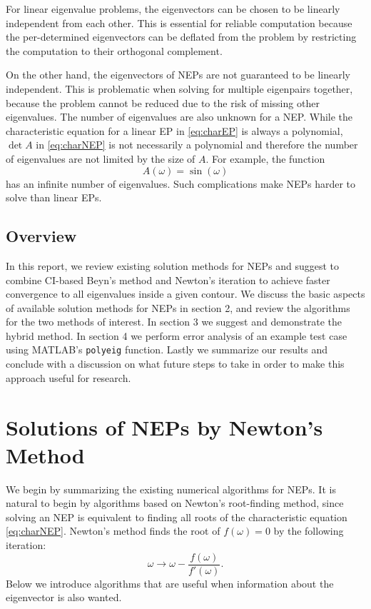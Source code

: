 \documentclass[11pt,letterpaper]{article}
\begin{document}
For linear eigenvalue problems, the eigenvectors can be chosen to be linearly independent from each other. This is essential for reliable computation because the per-determined eigenvectors can be deflated from the problem by restricting the computation to their orthogonal complement. 

On the other hand, the eigenvectors of NEPs are not guaranteed to be linearly independent. This is problematic when solving for multiple eigenpairs together, because the problem cannot be reduced due to the risk of missing other eigenvalues. The number of eigenvalues are also unknown for a NEP. While the characteristic equation for a linear EP in \ref{eq:charEP} is always a polynomial, $\det A$ in \ref{eq:charNEP} is not necessarily a polynomial and therefore the number of eigenvalues are not limited by the size of $A$. For example, the function
\begin{equation*}
A(\omega) = \sin(\omega)
\end{equation*} 
has an infinite number of eigenvalues. Such complications make NEPs harder to solve than linear EPs. 

\subsection{Overview}
In this report, we review existing solution methods for NEPs and suggest to combine CI-based Beyn's method and Newton's iteration to achieve faster convergence to all eigenvalues inside a given contour. We discuss the basic aspects of available solution methods for NEPs in section 2, and review the algorithms for the two methods of interest. In section 3 we suggest and demonstrate the hybrid method. In section 4 we perform error analysis of an example test case using MATLAB's {\tt polyeig} function. Lastly we summarize our results and conclude with a discussion on what future steps to take in order to make this approach useful for research. 

\section{Solutions of NEPs by Newton's Method }
We begin by summarizing the existing numerical algorithms for NEPs. It is natural to begin by algorithms based on Newton's root-finding method, since solving an NEP is equivalent to finding all roots of the characteristic equation \ref{eq:charNEP}. Newton's method finds the root of $f(\omega)=0$ by the following iteration:
\begin{equation}
	\label{eq:NewtIterate}
	\omega \rightarrow \omega - \frac{f(\omega)}{f'(\omega)}.
\end{equation}
Below we introduce algorithms that are useful when information about the eigenvector is also wanted.
\end{document}
